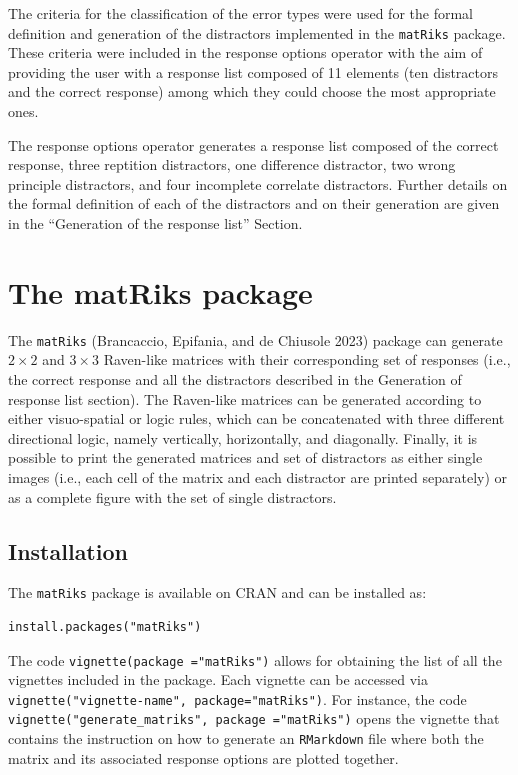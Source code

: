 The criteria for the classification of the error types were used for the formal definition and generation of the distractors implemented in the \texttt{matRiks} package.
These criteria were included in the response options operator with the aim of providing the user with a response list composed of 11 elements (ten distractors and the correct response) among which they could choose the most appropriate ones.

The response options operator generates a response list composed of the correct response, three reptition distractors, one difference distractor, two wrong principle distractors, and four incomplete correlate distractors.
Further details on the formal definition of each of the distractors and on their generation are given in the ``Generation of the response list'' Section.

\section{The matRiks package}\label{the-matriks-package}

The \texttt{matRiks} (Brancaccio, Epifania, and de Chiusole 2023) package can generate \(2 \times 2\) and \(3 \times 3\) Raven-like matrices with their corresponding set of responses (i.e., the correct response and all the distractors described in the Generation of response list section). The Raven-like matrices can be generated according to either visuo-spatial or logic rules, which can be concatenated with three different directional logic, namely vertically, horizontally, and diagonally.
Finally, it is possible to print the generated matrices and set of distractors as either single images (i.e., each cell of the matrix and each distractor are printed separately) or as a complete figure with the set of single distractors.

\subsection{Installation}\label{installation}

The \texttt{matRiks} package is available on CRAN and can be installed as:

\begin{verbatim}
install.packages("matRiks")
\end{verbatim}

The code \texttt{vignette(package\ ="matRiks")} allows for obtaining the list of all the vignettes included in the package. Each vignette can be accessed via \texttt{vignette("vignette-name",\ package="matRiks")}. For instance, the code \texttt{vignette("generate\_matriks",\ package\ ="matRiks")} opens the vignette that contains the instruction on how to generate an \texttt{RMarkdown} file where both the matrix and its associated response options are plotted together.

